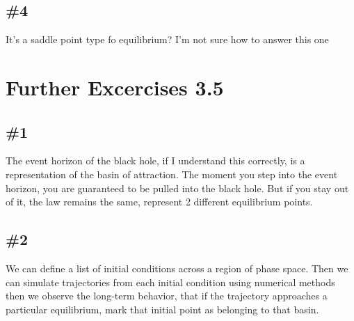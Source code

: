 \documentclass[12pt]{article}
\begin{document}
\subsection*{\#4}
It's a saddle point type fo equilibrium? I'm not sure how to answer this one

\section*{Further Excercises 3.5}
\subsection*{\#1}
The event horizon of the black hole, if I understand this correctly, is a representation of the basin of attraction. The moment you step into the event horizon, you are guaranteed to be pulled into the black hole. But if you stay out of it, the law remains the same, represent 2 different equilibrium points.

\subsection*{\#2}
We can define a list of initial conditions across a region of phase space. Then we can simulate trajectories from each initial condition using numerical methods then we observe the long-term behavior, that if the trajectory approaches a particular equilibrium, mark that initial point as belonging to that basin.
\end{document}
